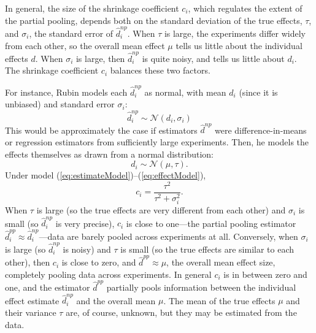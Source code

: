 \documentclass{edm_template}
\newcommand{\tauhat}{\hat{d}^{np}}
\newcommand{\shrink}{\hat{d}^{pp}}
\begin{document}
In general, the size of the shrinkage coefficient $c_i$, which regulates the extent of the partial pooling, depends both on the standard deviation of the true effects, $\tau$, and $\sigma_i$, the standard error of $\tauhat_i$.
When $\tau$ is large, the experiments differ widely from each other, so the overall mean effect $\mu$ tells us little about the individual effects $d$.
When $\sigma_i$ is large, then $\tauhat_i$ is quite noisy, and tells us little about $d_i$.
The shrinkage coefficient $c_i$ balances these two factors. 

For instance, Rubin \cite{rubin} models each $\tauhat_i$ as normal, with mean $d_i$ (since it is unbiased) and standard error $\sigma_i$:
\begin{equation}\label{eq:estimateModel}
\tauhat_i\sim\mathcal{N}\left(d_i,\sigma_i\right)
\end{equation}
This would be approximately the case if estimators $\tauhat$ were difference-in-means or regression estimators from sufficiently large experiments.
Then, he models the effects themselves as drawn from a normal distribution:
\begin{equation}\label{eq:effectModel}
d_i\sim\mathcal{N}(\mu,\tau).
\end{equation}
Under model (\ref{eq:estimateModel})--(\ref{eq:effectModel}), 
\begin{equation}\label{eq:shrinkageCoef}
c_i=\frac{\tau^2}{\tau^2+\sigma_i^2}.
\end{equation}
When $\tau$ is large (so the true effects are very different from each other) and $\sigma_i$ is small (so $\tauhat_i$ is very precise), $c_i$ is close to one---the partial pooling estimator $\shrink_i \approx \tauhat_i$---data are barely pooled across experiments at all. 
Conversely, when $\sigma_i$ is large (so $\tauhat_i$ is noisy) and $\tau$ is small (so the true effects are similar to each other), then $c_i$ is close to zero, and $\shrink\approx \mu$, the overall mean effect size, completely pooling data across experiments. 
In general $c_i$ is in between zero and one, and the estimator $\shrink$ partially pools information between the individual effect estimate $\tauhat_i$ and the overall mean $\mu$.
The mean of the true effects $\mu$ and their variance $\tau$ are, of course, unknown, but they may be estimated from the data. 
\end{document}
